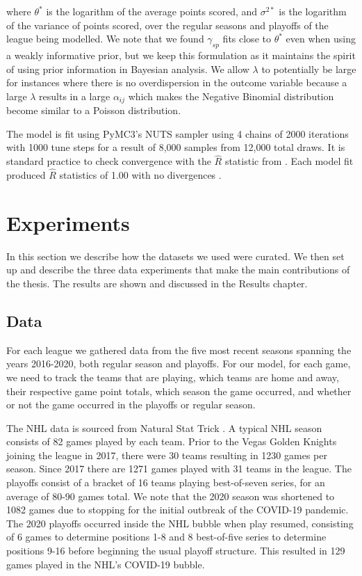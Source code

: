 where \(\theta^*\) is the logarithm of the average points scored, and \(\sigma^{2*}\) is the logarithm of the variance of points scored, over the regular seasons and playoffs of the league being modelled. We note that we found \(\gamma_{sp}\) fits close to \(\theta^*\) even when using a weakly informative prior, but we keep this formulation as it maintains the spirit of using prior information in Bayesian analysis. We allow \(\lambda\) to potentially be large for instances where there is no overdispersion in the outcome variable because a large \(\lambda\) results in a large \(\alpha_{ij}\) which makes the Negative Binomial distribution become similar to a Poisson distribution.

The model is fit using PyMC3's NUTS sampler using 4 chains of 2000 iterations with 1000 tune steps for a result of 8,000 samples from 12,000 total draws. It is standard practice to check convergence with the \(\hat{R}\) statistic from \cite{Gelman1992} \cite{Brooks1997}.  Each model fit produced \(\hat{R}\) statistics of 1.00 with no divergences \cite{Betancourt2017}.

\section{Experiments}

In this section we describe how the datasets we used were curated. We then set up and describe the three data experiments that make the main contributions of the thesis. The results are shown and discussed in the Results chapter.

\subsection{Data}

For each league we gathered data from the five most recent seasons spanning the years 2016-2020, both regular season and playoffs. For our model, for each game, we need to track the teams that are playing, which teams are home and away, their respective game point totals, which season the game occurred, and whether or not the game occurred in the playoffs or regular season.

The NHL data is sourced from Natural Stat Trick \cite{NS2020}. A typical NHL season consists of 82 games played by each team. Prior to the Vegas Golden Knights joining the league in 2017, there were 30 teams resulting in 1230 games per season. Since 2017 there are 1271 games played with 31 teams in the league. The playoffs consist of a bracket of 16 teams playing best-of-seven series, for an average of 80-90 games total. We note that the 2020 season was shortened to 1082 games due to stopping for the initial outbreak of the COVID-19 pandemic. The 2020 playoffs occurred inside the NHL bubble when play resumed, consisting of 6 games to determine positions 1-8 and 8 best-of-five series to determine positions 9-16 before beginning the usual playoff structure. This resulted in 129 games played in the NHL's COVID-19 bubble.

